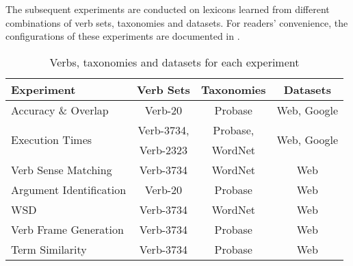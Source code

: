 The subsequent experiments are conducted on lexicons learned from
different combinations of verb sets, taxonomies and datasets. For
readers' convenience, the configurations of these experiments are documented
in .
\begin{table}[th]
\centering
\caption{Verbs, taxonomies and datasets for each experiment}
\begin{tabular}{|l|c|c|c|}
\hline
Experiment & Verb Sets & Taxonomies & Datasets \\
\hline \hline
Accuracy \& Overlap & Verb-20 & Probase &  Web, Google\\
\hline
\multirow{2}{*}{Execution Times} & Verb-3734, & Probase,
	& \multirow{2}{*}{Web, Google} \\
	& Verb-2323 & WordNet & \\
\hline
Verb Sense Matching & Verb-3734 & WordNet & Web \\
\hline
Argument Identification & Verb-20 & Probase & Web \\
\hline
WSD & Verb-3734 & WordNet & Web \\
\hline
Verb Frame Generation & Verb-3734 & Probase & Web \\
\hline
Term Similarity & Verb-3734 & Probase & Web \\
\hline
\end{tabular}
\label{tab:comb}
\end{table}

